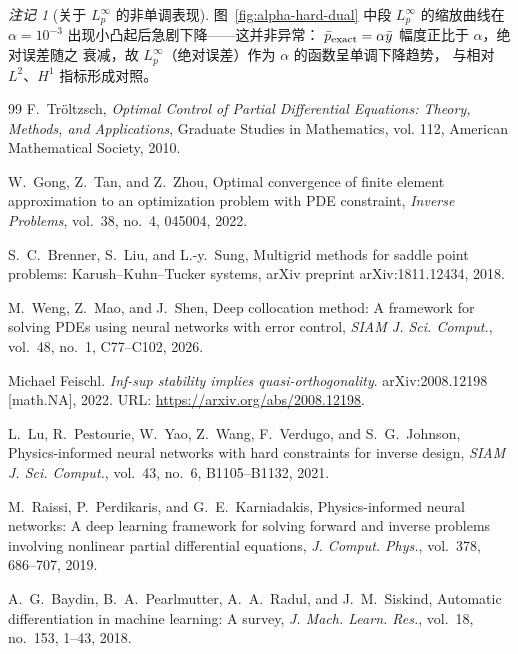 \documentclass{xmu}
\theoremstyle{plain}
\theoremstyle{remark}
\newtheorem{remark}[theorem]{注记}
\begin{document}
\begin{remark}[关于 $L^\infty_p$ 的非单调表现]
图~\ref{fig:alpha-hard-dual} 中段 $L^\infty_p$ 的缩放曲线在
$\alpha = 10^{-3}$ 出现小凸起后急剧下降——这并非异常：
$\bar p_{\rm exact} = \alpha \bar y$ 幅度正比于 $\alpha$，绝对误差随之
衰减，故 $L^\infty_p$（绝对误差）作为 $\alpha$ 的函数呈单调下降趋势，
与相对 $L^2$、$H^1$ 指标形成对照。
\end{remark}



\begin{reference}
    \begin{thebibliography}{99}
    F.~Tröltzsch,
    \textit{Optimal Control of Partial Differential Equations: Theory, Methods, and Applications},
    Graduate Studies in Mathematics, vol. 112, American Mathematical Society, 2010.

    W.~Gong, Z.~Tan, and Z.~Zhou,
    Optimal convergence of finite element approximation to an optimization problem with PDE constraint,
    \textit{Inverse Problems}, vol.~38, no.~4, 045004, 2022.

    S.~C.~Brenner, S.~Liu, and L.-y.~Sung,
    Multigrid methods for saddle point problems: Karush--Kuhn--Tucker systems,
    arXiv preprint arXiv:1811.12434, 2018.

    M.~Weng, Z.~Mao, and J.~Shen,
    Deep collocation method: A framework for solving PDEs using neural networks with error control,
    \textit{SIAM J. Sci. Comput.}, vol.~48, no.~1, C77--C102, 2026.

    Michael Feischl.
    \textit{Inf-sup stability implies quasi-orthogonality}.
    arXiv:2008.12198 [math.NA], 2022.
    URL: \url{https://arxiv.org/abs/2008.12198}.

    L.~Lu, R.~Pestourie, W.~Yao, Z.~Wang, F.~Verdugo, and S.~G.~Johnson,
    Physics-informed neural networks with hard constraints for inverse design,
    \textit{SIAM J. Sci. Comput.}, vol.~43, no.~6, B1105--B1132, 2021.

    M.~Raissi, P.~Perdikaris, and G.~E.~Karniadakis,
    Physics-informed neural networks: A deep learning framework for solving forward and inverse problems involving nonlinear partial differential equations,
    \textit{J. Comput. Phys.}, vol.~378, 686--707, 2019.

    A.~G.~Baydin, B.~A.~Pearlmutter, A.~A.~Radul, and J.~M.~Siskind,
    Automatic differentiation in machine learning: A survey,
    \textit{J. Mach. Learn. Res.}, vol.~18, no.~153, 1--43, 2018.


\end{thebibliography}
\end{reference}
\end{document}
